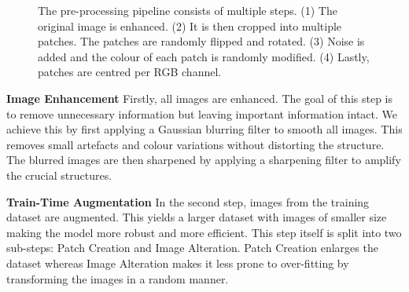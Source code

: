 \documentclass[10pt,conference,compsocconf]{IEEEtran}
\begin{document}
\begin{figure}[h]
    
    \caption{The pre-processing pipeline consists of multiple steps. (1) The original image is enhanced. (2) It is then cropped into multiple patches. The patches are randomly flipped and rotated. (3) Noise is added and the colour of each patch is randomly modified. (4) Lastly, patches are centred per RGB channel. }
    \label{fig:processing_pipeline}
\end{figure}

\textbf{Image Enhancement}
Firstly, all images are enhanced. The goal of this step is to remove unnecessary information but leaving important information intact. We achieve this by first applying a Gaussian blurring filter to smooth all images. This removes small artefacts and colour variations without distorting the structure. The blurred images are then sharpened by applying a sharpening filter to amplify the crucial structures.

\textbf{Train-Time Augmentation}
In the second step, images from the training dataset are augmented. This yields a larger dataset with images of smaller size making the model more robust and more efficient. This step itself is split into two sub-steps: Patch Creation and Image Alteration. Patch Creation enlarges the dataset whereas Image Alteration makes it less prone to over-fitting by transforming the images in a random manner.
\end{document}
